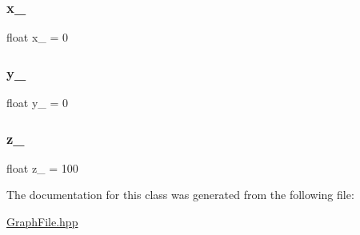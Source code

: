 \mbox{\label{classmouse__t_a902ac86b499a19c0cd4405d18bf03551}} 
\subsubsection{\texorpdfstring{x\+\_\+}{x\_}}
{\footnotesize\ttfamily float x\+\_\+ = 0}

\mbox{\label{classmouse__t_ac026f8fee6095db0f1867db5c250b83f}} 
\subsubsection{\texorpdfstring{y\+\_\+}{y\_}}
{\footnotesize\ttfamily float y\+\_\+ = 0}

\mbox{\label{classmouse__t_a42626aabbe4860f2e6bb5e0e840c8e1d}} 
\subsubsection{\texorpdfstring{z\+\_\+}{z\_}}
{\footnotesize\ttfamily float z\+\_\+ = 100}



The documentation for this class was generated from the following file\+:\begin{DoxyCompactItemize}
\item 
\hyperlink{GraphFile_8hpp}{Graph\+File.\+hpp}\end{DoxyCompactItemize}
